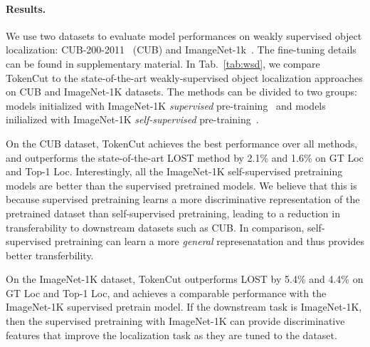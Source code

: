 \documentclass[twocolumn]{article}
\begin{document}
\paragraph{Results.}
\vspace{-10pt}
We use two datasets to evaluate model performances on weakly supervised object localization: CUB-200-2011~\cite{WahCUB_200_2011} (CUB) and ImangeNet-1k~\cite{russakovsky2015imagenet}. The fine-tuning details can be found in supplementary material. In Tab.~\ref{tab:wsd}, we compare TokenCut to the state-of-the-art weakly-supervised object localization approaches on CUB and ImageNet-1K datasets. The methods can be divided to two groups: models initialized with ImageNet-1K \textit{supervised} pre-training~\cite{zhou2016learning, singh2017hide, choe2019attention, zhang2020inter, zhang2020rethinking, guo2021strengthen, bae2020rethinkingCAM} and models inilialized with ImageNet-1K \textit{self-supervised} pre-training~\cite{simeoni2021localizing}. 

On the CUB dataset, TokenCut achieves the best performance over all methods, and outperforms the state-of-the-art LOST method by 2.1\% and 1.6\% on GT Loc and Top-1 Loc. Interestingly, all the ImageNet-1K self-supervised pretraining models are better than the supervised pretrained models. We believe that this is  because supervised pretraining learns a more discriminative representation of the pretrained dataset than  self-supervised pretraining, leading to a reduction in transferability to downstream datasets such as CUB. In comparison,  self-supervised pretraining can learn a more \textit{general} represenatation and thus provides better transferbility.

On the ImageNet-1K dataset,  TokenCut outperforms LOST by 5.4\% and 4.4\% on GT Loc and Top-1 Loc, and achieves a comparable performance with the ImageNet-1K supervised pretrain model. If the downstream task is ImageNet-1K, then the supervised pretraining with ImageNet-1K can provide discriminative features that improve the localization task as they are tuned to the dataset.
\end{document}
